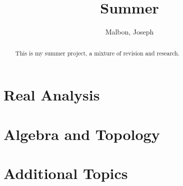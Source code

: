 \documentclass{article}
\title{Summer}
\author{Malbon, Joseph}
\theoremstyle{BreakBold}
\theoremstyle{example}
\theoremstyle{definition}
\begin{document}
\begin{titlingpage}
\maketitle
\begin{abstract}
This is my summer project, a mixture of revision and research.
\end{abstract}
\tableofcontents
\end{titlingpage}

\newpage
\section{Real Analysis}\label{sec:1}


\newpage
\section{Algebra and Topology}\label{sec:2}


\newpage
\section{Additional Topics}\label{sec:3}

\end{document}
